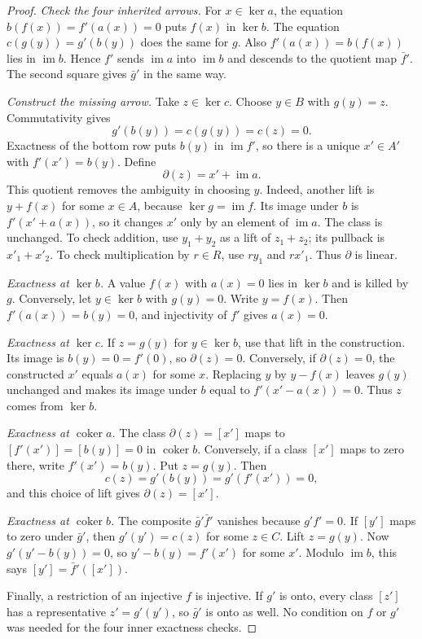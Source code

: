 \begin{proof}
\emph{Check the four inherited arrows.} For $x\in\ker a$, the equation $b(f(x))=f'(a(x))=0$ puts $f(x)$ in $\ker b$. The equation $c(g(y))=g'(b(y))$ does the same for $g$. Also $f'(a(x))=b(f(x))$ lies in $\operatorname{im}b$. Hence $f'$ sends $\operatorname{im}a$ into $\operatorname{im}b$ and descends to the quotient map $\bar f'$. The second square gives $\bar g'$ in the same way.

\emph{Construct the missing arrow.} Take $z\in\ker c$. Choose $y\in B$ with $g(y)=z$. Commutativity gives
\[
g'(b(y))=c(g(y))=c(z)=0.
\]
Exactness of the bottom row puts $b(y)$ in $\operatorname{im}f'$, so there is a unique $x'\in A'$ with $f'(x')=b(y)$. Define
\[
\partial(z)=x'+\operatorname{im}a.
\]
This quotient removes the ambiguity in choosing $y$. Indeed, another lift is $y+f(x)$ for some $x\in A$, because $\ker g=\operatorname{im}f$. Its image under $b$ is $f'(x'+a(x))$, so it changes $x'$ only by an element of $\operatorname{im}a$. The class is unchanged. To check addition, use $y_1+y_2$ as a lift of $z_1+z_2$; its pullback is $x'_1+x'_2$. To check multiplication by $r\in R$, use $ry_1$ and $rx'_1$. Thus $\partial$ is linear.

\emph{Exactness at $\ker b$.} A value $f(x)$ with $a(x)=0$ lies in $\ker b$ and is killed by $g$. Conversely, let $y\in\ker b$ with $g(y)=0$. Write $y=f(x)$. Then $f'(a(x))=b(y)=0$, and injectivity of $f'$ gives $a(x)=0$.

\emph{Exactness at $\ker c$.} If $z=g(y)$ for $y\in\ker b$, use that lift in the construction. Its image is $b(y)=0=f'(0)$, so $\partial(z)=0$. Conversely, if $\partial(z)=0$, the constructed $x'$ equals $a(x)$ for some $x$. Replacing $y$ by $y-f(x)$ leaves $g(y)$ unchanged and makes its image under $b$ equal to $f'(x'-a(x))=0$. Thus $z$ comes from $\ker b$.

\emph{Exactness at $\operatorname{coker}a$.} The class $\partial(z)=[x']$ maps to $[f'(x')]=[b(y)]=0$ in $\operatorname{coker}b$. Conversely, if a class $[x']$ maps to zero there, write $f'(x')=b(y)$. Put $z=g(y)$. Then
\[
c(z)=g'(b(y))=g'(f'(x'))=0,
\]
and this choice of lift gives $\partial(z)=[x']$.

\emph{Exactness at $\operatorname{coker}b$.} The composite $\bar g'\bar f'$ vanishes because $g'f'=0$. If $[y']$ maps to zero under $\bar g'$, then $g'(y')=c(z)$ for some $z\in C$. Lift $z=g(y)$. Now $g'(y'-b(y))=0$, so $y'-b(y)=f'(x')$ for some $x'$. Modulo $\operatorname{im}b$, this says $[y']=\bar f'([x'])$.

Finally, a restriction of an injective $f$ is injective. If $g'$ is onto, every class $[z']$ has a representative $z'=g'(y')$, so $\bar g'$ is onto as well. No condition on $f$ or $g'$ was needed for the four inner exactness checks.
\end{proof}


